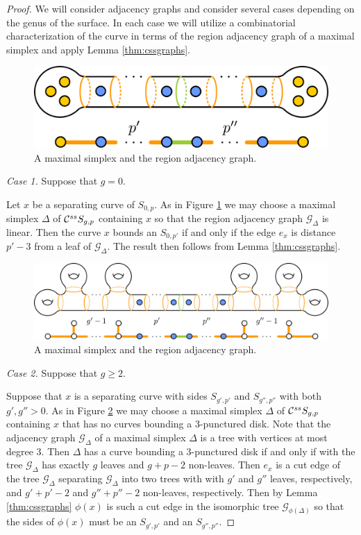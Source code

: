 \begin{proof}
  We will consider adjacency graphs and consider several cases depending on the genus of the surface.
  In each case we will utilize a combinatorial characterization of the curve in terms of the region adjacency graph
  of a maximal simplex and apply Lemma \ref{thm:cssgraphs}.

  \begin{figure}[h!]
    \centering
    \includegraphics[width=.6\textwidth]{figures/cssmaxsimp4.pdf}
    \caption{A maximal simplex and the region adjacency graph.}
    \label{fig:cssmaxsimp4}
  \end{figure}

    \emph{Case 1.} Suppose that $g=0$.

    Let $x$ be a separating curve of $S_{0,p}$.
    As in Figure \ref{fig:cssmaxsimp4} we may choose a maximal simplex $\Delta$ of $ \mathcal C^{{ss}}  S_{g,p}$
    containing $x$ so that the region adjacency graph $\mathcal G_\Delta$ is linear.
    Then the curve $x$ bounds an $S_{0,p'}$ if and only if the edge $e_x$ is distance $p'-3$ from a leaf of $\mathcal G_\Delta$.
    The result then follows from Lemma \ref{thm:cssgraphs}.

    \begin{figure}[h!]
      \centering
      \includegraphics[width=\textwidth]{figures/cssmaxsimp1.pdf}
      \caption{A maximal simplex and the region adjacency graph.}
      \label{fig:cssmaxsimp1}
    \end{figure}
    \emph{Case 2.} Suppose that $g\geq 2$.

    Suppose that $x$ is a separating curve with sides $S_{g',p'}$ and $S_{g'',p''}$ with both $g',g''>0$.
    As in Figure \ref{fig:cssmaxsimp1} we may choose a maximal simplex $\Delta$ of $ \mathcal C^{{ss}}  S_{g,p}$ containing $x$ that has no
    curves bounding a 3-punctured disk.
    Note that the adjacency graph $\mathcal G_\Delta$ of a maximal simplex $\Delta$ is a tree with vertices at most degree 3.
    Then $\Delta$ has a curve bounding a 3-punctured disk if and only if
    with the tree $\mathcal G_\Delta$ has exactly $g$ leaves and $g+p-2$ non-leaves.
    Then $e_x$ is a cut edge of the tree $\mathcal G_\Delta$ separating $\mathcal G_\Delta$ into two trees with
    with $g'$  and $g''$  leaves, respectively, and $g'+p'-2$  and $g''+p''-2$ non-leaves, respectively.
    Then by Lemma \ref{thm:cssgraphs} $\phi(x)$ is such a cut edge in the isomorphic tree $\mathcal G_{\phi(\Delta)}$
    so that the sides of $\phi(x)$ must be an $S_{g',p'}$ and an $S_{g'',p''}$.


\end{proof}
